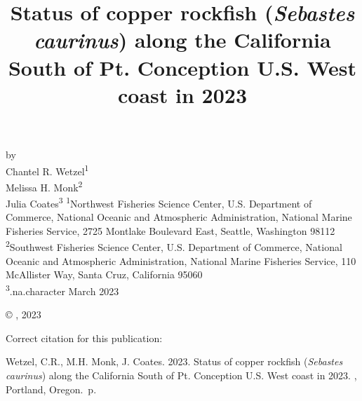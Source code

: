 \documentclass[11pt,
  english,
  letterpaper,
]{article}
\date{}
\newcommand{\trTitle}{Status of copper rockfish (\emph{Sebastes caurinus}) along the California South of Pt. Conception U.S. West coast in 2023}
\newcommand{\trYear}{2023}
\newcommand{\trMonth}{March}
\newcommand{\trAuthsBack}{Wetzel, C.R., M.H. Monk, J. Coates}
\newcommand{\trCitation}{
\begin{hangparas}{1em}{1}
\trAuthsBack{}. \trYear{}. \trTitle{}. \glsentrylong{pfmc}, Portland, Oregon. \pageref{LastPage}{}\,p.
\end{hangparas}}
\begin{document}

\renewcommand*{\thefootnote}{\fnsymbol{footnote}}

\small
\thispagestyle{empty}
\noindent
\begin{center}
\title{Status of copper rockfish (\emph{Sebastes caurinus}) along the California South of Pt. Conception U.S. West coast in 2023}
\vspace{1.5cm}
{\Large\textbf{}}
\vfill
by\\
Chantel R. Wetzel\textsuperscript{1}\\
Melissa H. Monk\textsuperscript{2}\\
Julia Coates\textsuperscript{3}\vfill
\textsuperscript{1}Northwest Fisheries Science Center, U.S. Department of Commerce, National Oceanic and Atmospheric Administration, National Marine Fisheries Service, 2725 Montlake Boulevard East, Seattle, Washington 98112\\
\textsuperscript{2}Southwest Fisheries Science Center, U.S. Department of Commerce, National Oceanic and Atmospheric Administration, National Marine Fisheries Service, 110 McAllister Way, Santa Cruz, California 95060\\
\textsuperscript{3}.na.character\vfill
\trMonth{} \trYear{}
\end{center}
\clearpage

\thispagestyle{empty}
\vspace*{\fill}
\begin{center}
\copyright{} , \trYear{}\\
\end{center}
\par
\bigskip
\noindent
Correct citation for this publication:
\bigskip
\par
\trCitation{}
\clearpage


\tableofcontents\clearpage
\label{TRlastRoman}
\clearpage

\newpage
\thispagestyle{empty} %

\pagestyle{plain}  %
\renewcommand*{\thefootnote}{\arabic{footnote}}  %
\setcounter{footnote}{0}  %
\renewcommand{\headrulewidth}{0.5pt}
\renewcommand{\footrulewidth}{0.5pt}
\end{document}
